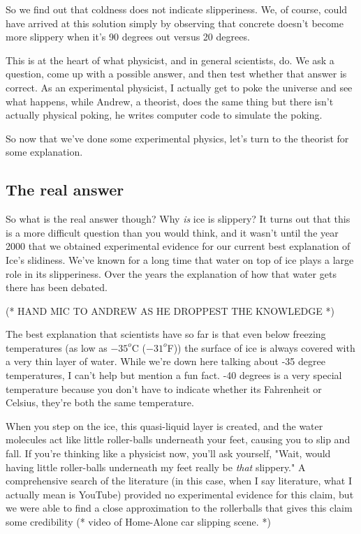 \documentclass[12pt]{article}
\begin{document}
So we find out that coldness does not indicate slipperiness.
We, of course, could have arrived at this solution simply by observing that
concrete doesn't become more slippery when it's 90 degrees out versus 20 degrees. 

This is at the heart of what physicist, and in general scientists, do. We ask 
a question, come up with a possible answer, and then test whether that answer is
correct. As an experimental physicist, I actually get to poke the universe and
see what happens, while Andrew, a theorist, does the same thing but there isn't actually 
physical poking, he writes computer code to simulate the poking. 

So now that
we've done some experimental physics, let's turn to the theorist for some
explanation.

\subsection{The real answer}
So what is the real answer though? Why \emph{is} ice is slippery? 
It turns out that this is a more difficult question than you would think, and
it wasn't until the year 2000 that we obtained experimental evidence for our 
current best explanation of Ice's slidiness. We've known for a long time
that water on top of ice plays a large role in its slipperiness. Over the years
the explanation of how that water gets there has been debated. 

(* HAND MIC TO ANDREW AS HE DROPPEST THE KNOWLEDGE *)

The best explanation that scientists have so far is that even below freezing 
temperatures (as low as $-35^o$C ($-31^{o}$F)) the surface of ice is always 
covered with a very thin layer of water. While we're down here talking about 
-35 degree temperatures, I can't help but mention a fun fact. -40 degrees is a 
very special temperature because you don't have to indicate whether its 
Fahrenheit or Celsius, they're both the same temperature. 

When you step on the ice,  this quasi-liquid layer is created, and the
water molecules 
act like little roller-balls underneath your feet, causing you to slip and fall. 
If you're thinking like a physicist now, you'll ask yourself, "Wait, would having
little roller-balls underneath my feet really be \emph{that} slippery." A 
comprehensive search of the literature (in this case, when I say literature, 
what I actually mean is YouTube) provided no experimental 
evidence for this claim, but we were able to find a close approximation to 
the rollerballs that gives this claim some credibility (* video of Home-Alone
car slipping scene. *) 
\end{document}
